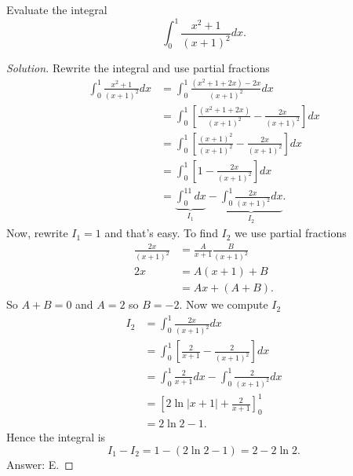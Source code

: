 \begin{problem}
Evaluate the integral
\[
\int_0^1\frac{x^2+1}{(x+1)^2}dx.
\]
\end{problem}
\begin{proof}[Solution]
Rewrite the integral and use partial fractions
\begin{align*}
\int_0^1\frac{x^2+1}{(x+1)^2}dx
&=\int_0^1\frac{(x^2+1+2x)-2x}{(x+1)^2}dx\\
&=\int_0^1\left[\frac{(x^2+1+2x)}{(x+1)^2}-\frac{2x}{(x+1)^2}\right]dx\\
&=\int_0^1\left[\frac{(x+1)^2}{(x+1)^2}-\frac{2x}{(x+1)^2}\right]dx\\
&=\int_0^1\left[1-\frac{2x}{(x+1)^2}\right]dx\\
&=\underbrace{\int_0^11dx}_{I_1}-\underbrace{\int_0^1\frac{2x}{(x+1)^2}dx}_{I_2}.
\end{align*}
Now, rewrite $I_1=1$ and that's easy. To find $I_2$ we use partial
fractions
\begin{align*}
\frac{2x}{(x+1)^2}&=\frac{A}{x+1}\frac{B}{(x+1)^2}\\
2x&=A(x+1)+B\\
 &=Ax+(A+B).
\end{align*}
So $A+B=0$ and $A=2$ so $B=-2$. Now we compute $I_2$
\begin{align*}
I_2&=\int_0^1\frac{2x}{(x+1)^2}dx\\
   &=\int_0^1\left[\frac{2}{x+1}-\frac{2}{(x+1)^2}\right]dx\\
   &=\int_0^1\frac{2}{x+1}dx-\int_0^1\frac{2}{(x+1)^2}dx\\
   &=\left[2\ln|x+1|+\frac{2}{x+1}\right]_0^1\\
   &=2\ln 2-1.
\end{align*}
Hence the integral is
\[
I_1-I_2=1-(2\ln 2-1)=\boxed{2-2\ln 2.}
\]
Answer: {\color{Red} E}.
\end{proof}

